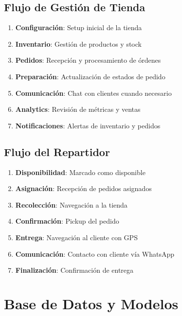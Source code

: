 \documentclass[12pt,a4paper]{article}
\begin{document}
\subsection{Flujo de Gestión de Tienda}
\begin{enumerate}[label=\arabic*.]
    \item \textbf{Configuración}: Setup inicial de la tienda
    \item \textbf{Inventario}: Gestión de productos y stock
    \item \textbf{Pedidos}: Recepción y procesamiento de órdenes
    \item \textbf{Preparación}: Actualización de estados de pedido
    \item \textbf{Comunicación}: Chat con clientes cuando necesario
    \item \textbf{Analytics}: Revisión de métricas y ventas
    \item \textbf{Notificaciones}: Alertas de inventario y pedidos
\end{enumerate}

\subsection{Flujo del Repartidor}
\begin{enumerate}[label=\arabic*.]
    \item \textbf{Disponibilidad}: Marcado como disponible
    \item \textbf{Asignación}: Recepción de pedidos asignados
    \item \textbf{Recolección}: Navegación a la tienda
    \item \textbf{Confirmación}: Pickup del pedido
    \item \textbf{Entrega}: Navegación al cliente con GPS
    \item \textbf{Comunicación}: Contacto con cliente vía WhatsApp
    \item \textbf{Finalización}: Confirmación de entrega
\end{enumerate}

\section{Base de Datos y Modelos}
\end{document}
